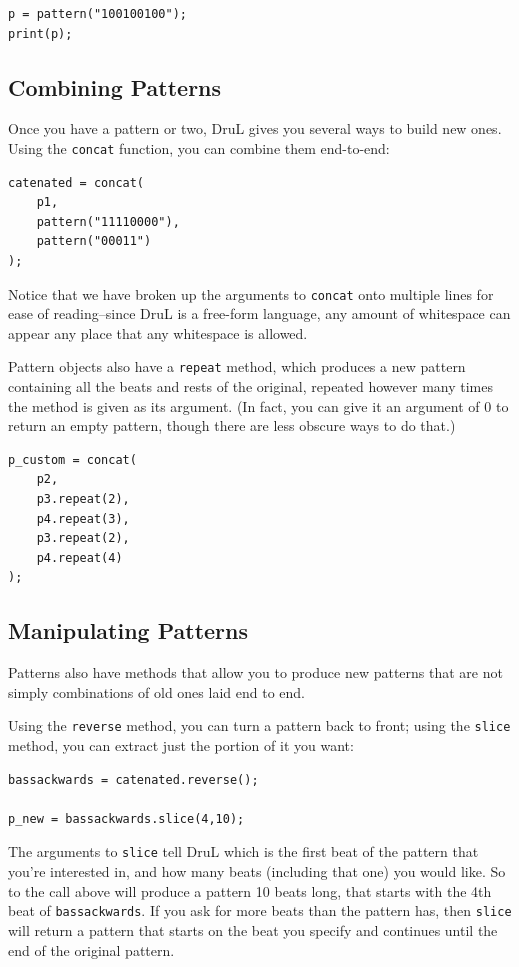 \begin{lstlisting}
p = pattern("100100100");
print(p);
\end{lstlisting}


\subsection{Combining Patterns}
	
Once you have a pattern or two, DruL gives you several ways to build new ones.  Using the {\tt concat} function, you can combine them end-to-end:
\begin{lstlisting}
catenated = concat(
	p1, 
	pattern("11110000"), 
	pattern("00011")
);
\end{lstlisting}
Notice that we have broken up the arguments to {\tt concat} onto multiple lines for ease of reading--since DruL is a free-form language, any amount of whitespace can appear any place that any whitespace is allowed.

Pattern objects also have a {\tt repeat} method, which produces a new pattern containing all the beats and rests of the original, repeated however many times the method is given as its argument.  (In fact, you can give it an argument of 0 to return an empty pattern, though there are less obscure ways to do that.)

\begin{lstlisting}
p_custom = concat(
	p2, 
	p3.repeat(2),
	p4.repeat(3),
	p3.repeat(2),
	p4.repeat(4)
);
\end{lstlisting}	
\subsection{Manipulating Patterns}

Patterns also have methods that allow you to produce new patterns that are not simply combinations of old ones laid end to end.

Using the {\tt reverse} method, you can turn a pattern back to front; using the {\tt slice} method, you can extract just the portion of it you want:

\begin{lstlisting}
bassackwards = catenated.reverse();

p_new = bassackwards.slice(4,10);
\end{lstlisting}

The arguments to {\tt slice} tell DruL which is the first beat of the pattern that you're interested in, and how many beats (including that one) you would like.  So to the call above will produce a pattern 10 beats long, that starts with the 4th beat of {\tt bassackwards}.  If you ask for more beats than the pattern has, then {\tt slice} will return a pattern that starts on the beat you specify and continues until the end of the original pattern.

